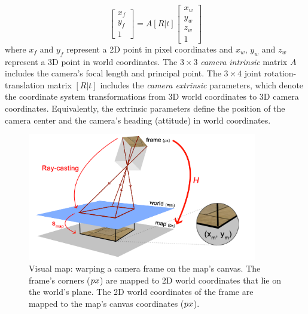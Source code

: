 \begin{equation}
\left[ {
\begin{array}{c} x_f \\ y_f \\ 1 \end{array}
} \right]
= A[R|t]
\left[ {
\begin{array}{c} x_w \\ y_w \\ z_w \\ 1 \end{array}
} \right]
\end{equation}
where $x_f$ and $y_f$ represent a 2D point in pixel coordinates and $x_w$, $y_w$ and $z_w$ represent a 3D point in world coordinates.
The $3 \times 3$ \textit{camera intrinsic} matrix $A$ includes the camera's focal length and principal point.
The $3 \times 4$ joint rotation-translation matrix $[R|t]$ includes the \textit{camera extrinsic} parameters, which denote the coordinate system transformations from 3D world coordinates to 3D camera coordinates. Equivalently, the extrinsic parameters define the position of the camera center and the camera's heading (attitude) in world coordinates.

\begin{figure}[htb]
\centering
\includegraphics[width=10cm]{images/mapping1.png}
\caption{Visual map: warping a camera frame on the map's canvas. The frame's corners ($\small{px}$) are mapped to 2D world coordinates that lie on the world's plane. The 2D world coordinates of the frame are mapped to the map's canvas coordinates ($\small{px}$).}
\label{fig:mapping2}
\end{figure}

